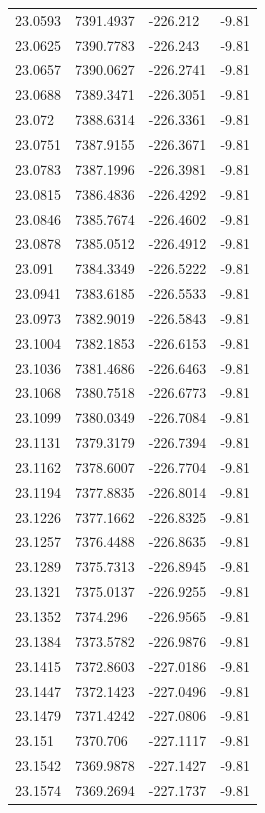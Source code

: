 \begin{table}[H]
\begin{tabular}{llll}
23.0593 & 7391.4937 & -226.212 & -9.81 \\
23.0625 & 7390.7783 & -226.243 & -9.81 \\
23.0657 & 7390.0627 & -226.2741 & -9.81 \\
23.0688 & 7389.3471 & -226.3051 & -9.81 \\
23.072 & 7388.6314 & -226.3361 & -9.81 \\
23.0751 & 7387.9155 & -226.3671 & -9.81 \\
23.0783 & 7387.1996 & -226.3981 & -9.81 \\
23.0815 & 7386.4836 & -226.4292 & -9.81 \\
23.0846 & 7385.7674 & -226.4602 & -9.81 \\
23.0878 & 7385.0512 & -226.4912 & -9.81 \\
23.091 & 7384.3349 & -226.5222 & -9.81 \\
23.0941 & 7383.6185 & -226.5533 & -9.81 \\
23.0973 & 7382.9019 & -226.5843 & -9.81 \\
23.1004 & 7382.1853 & -226.6153 & -9.81 \\
23.1036 & 7381.4686 & -226.6463 & -9.81 \\
23.1068 & 7380.7518 & -226.6773 & -9.81 \\
23.1099 & 7380.0349 & -226.7084 & -9.81 \\
23.1131 & 7379.3179 & -226.7394 & -9.81 \\
23.1162 & 7378.6007 & -226.7704 & -9.81 \\
23.1194 & 7377.8835 & -226.8014 & -9.81 \\
23.1226 & 7377.1662 & -226.8325 & -9.81 \\
23.1257 & 7376.4488 & -226.8635 & -9.81 \\
23.1289 & 7375.7313 & -226.8945 & -9.81 \\
23.1321 & 7375.0137 & -226.9255 & -9.81 \\
23.1352 & 7374.296 & -226.9565 & -9.81 \\
23.1384 & 7373.5782 & -226.9876 & -9.81 \\
23.1415 & 7372.8603 & -227.0186 & -9.81 \\
23.1447 & 7372.1423 & -227.0496 & -9.81 \\
23.1479 & 7371.4242 & -227.0806 & -9.81 \\
23.151 & 7370.706 & -227.1117 & -9.81 \\
23.1542 & 7369.9878 & -227.1427 & -9.81 \\
23.1574 & 7369.2694 & -227.1737 & -9.81 \\

\end{tabular}
\end{table}
